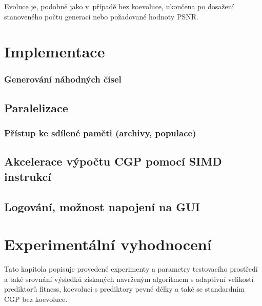Evoluce je, podobně jako v~případě bez koevoluce, ukončena po dosažení stanoveného počtu generací nebo požadované hodnoty PSNR.


\chapter{Implementace}
\label{chImplementation}



\subsection{Generování náhodných čísel}

\section{Paralelizace}




\subsection{Přístup ke sdílené paměti (archivy, populace)}


\section{Akcelerace výpočtu CGP pomocí SIMD instrukcí}


\section{Logování, možnost napojení na GUI}

\chapter{Experimentální vyhodnocení}
\label{chExperiments}

Tato kapitola popisuje provedené experimenty a parametry testovacího prostředí a také srovnání výsledků získaných navrženým algoritmem s adaptivní velikostí prediktorů fitness, koevolucí s prediktory pevné délky a také se standardním CGP bez koevoluce.

